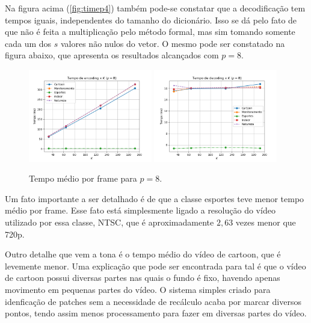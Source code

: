 \documentclass[cic,tc]{iiufrgs}
\begin{document}
Na figura acima (\autoref{fig:timep4}) também pode-se constatar que a decodificação tem tempos iguais, independentes
do tamanho do dicionário.
Isso se dá pelo fato de que não é feita a multiplicação pelo método formal, mas sim tomando
somente cada um dos $s$ valores não nulos do vetor.
O mesmo pode ser constatado na figura abaixo, que apresenta os resultados alcançados com $p=8$.

\begin{figure}[h]
    \caption{Tempo médio por frame para $p=8$.}
    \begin{center}
        \includegraphics[width=0.48\textwidth]{img/graficos/p8_ds_etime.png}
        \includegraphics[width=0.48\textwidth]{img/graficos/p8_ds_dtime.png}
    \end{center}
    \label{fig:timep8}
\end{figure}

Um fato importante a ser detalhado é de que a classe esportes teve menor tempo médio por frame.
Esse fato está simplesmente ligado a resolução do vídeo utilizado por essa classe, NTSC, que é 
aproximadamente $2,63$ vezes menor que 720p.

Outro detalhe que vem a tona é o tempo médio do vídeo de cartoon, que é levemente menor.
Uma explicação que pode ser encontrada para tal é que o vídeo de cartoon possui diversas 
partes nas quais o fundo é fixo, havendo apenas movimento em pequenas partes do vídeo. 
O sistema simples criado para idenficação de patches sem a necessidade de recálculo 
acaba por marcar diversos pontos, tendo assim menos processamento para fazer em diversas 
partes do vídeo.
\end{document}

